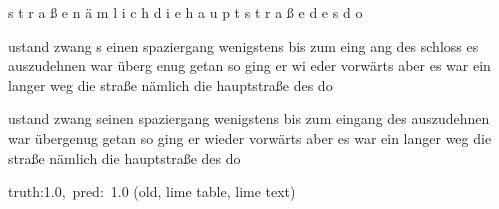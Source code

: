 \documentclass[a4paper,10pt,twoside]{article}
\begin{document}
{\color[rgb]{0.003,0,0} s}{\color[rgb]{0.002,0,0} t}{\color[rgb]{0.001,0,0} r}{\color[rgb]{0.001,0,0} a}{\color[rgb]{0.001,0,0} ß}{\color[rgb]{0.001,0,0} e} {\color[rgb]{0.004,0,0} n}{\color[rgb]{0.004,0,0} ä}{\color[rgb]{0.007,0,0} m}{\color[rgb]{0.006,0,0} l}{\color[rgb]{0.03,0,0} i}{\color[rgb]{0.046,0,0} c}{\color[rgb]{0.016,0,0} h} {\color[rgb]{0.0,0,0} d}{\color[rgb]{0.0,0,0} i}{\color[rgb]{0.009,0,0} e} {\color[rgb]{0.01,0,0} h}{\color[rgb]{0.012,0,0} a}{\color[rgb]{0.0,0,0} u}{\color[rgb]{0.006,0,0} p}{\color[rgb]{0.025,0,0} t}{\color[rgb]{0.031,0,0} s}{\color[rgb]{0.012,0,0} t}{\color[rgb]{0.022,0,0} r}{\color[rgb]{0.015,0,0} a}{\color[rgb]{0.012,0,0} ß}{\color[rgb]{0.078,0,0} e} {\color[rgb]{0.089,0,0} d}{\color[rgb]{0.06,0,0} e}{\color[rgb]{0.03,0,0} s} {\color[rgb]{0.0,0,0} d}{\color[rgb]{0.0,0,0} o}

ustand zwang s{\color[rgb]{1,0,0} e}inen spaziergang wenigstens bis zum eing{\color[rgb]{1,0,0} a}ng des schloss{\color[rgb]{0,0,1} e}s auszudehnen war überg{\color[rgb]{0,0,1} e}nug getan so ging er wi{\color[rgb]{0,0,1} e}der vorwärts aber es war ein langer weg die straße nämlich die hauptstraße des do

 ustand {\color[rgb]{0,0,1} zwang} seinen {\color[rgb]{0,0,1} spaziergang} {\color[rgb]{1,0,0} wenigstens} bis zum {\color[rgb]{1,0,0} eingang} des  auszudehnen war übergenug getan so ging er wieder vorwärts aber es war ein langer weg die straße nämlich die hauptstraße des do

 {\footnotesize {\color[rgb]{0.6, 0.6, 0.6}truth:1.0,~pred:~1.0}} (old, lime table, lime text)\hrulefill
\end{document}
